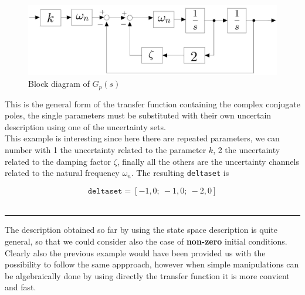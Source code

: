 \documentclass[a4paper, 12pt]{article}
\begin{document}
\begin{figure}[h]
    \centering
    \includegraphics[scale=0.3]{img/complex_conj_plant.jpeg}
    \caption{Block diagram of $G_p(s)$}
\end{figure}
\newpage
\noindent
This is the general form of the transfer function containing the complex conjugate poles, the single parameters must be substituted with their own uncertain description using one of the uncertainty sets.\\
 This example is interesting since here there are repeated parameters, we can number with 1 the uncertainty related to the parameter $k$, 2 the uncertainty related to the damping factor $\zeta$, finally all the others are the uncertainty channels related to the natural frequency $\omega_n$. The resulting \texttt{deltaset} is
 
 \begin{equation}
    \texttt{deltaset}=[
        -1,0; \
        -1,0; \
        -2,0
    ]
 \end{equation}\\
\vspace{-1cm}
\hrule
\vspace{0.3em}
\noindent
\textsf{The description obtained so far by using the state space description is quite general, so that we could consider also the case of \textbf{non-zero} initial conditions. Clearly also the previous example would have been provided us with the possibility to follow the same appproach, however when simple manipulations can be algebraically done by using directly the transfer function it is more convient and fast.}
\end{document}
